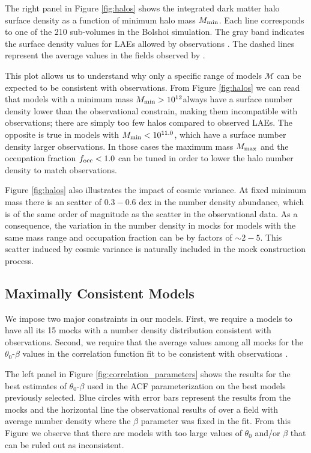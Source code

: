 \documentclass{emulateapj}
\newcommand{\hMsun}{{\ifmmode{h^{-1}{\rm
        {M_{\odot}}}}\else{$h^{-1}{\rm{M_{\odot}}}$}\fi}}
\begin{document}
The right panel in Figure \ref{fig:halos} shows the  integrated dark matter halo surface
density as a function of  minimum halo mass $M_{\rm min}$. Each line
corresponds to one of the 210 sub-volumes in the Bolshoi
simulation. The gray band indicates the surface density values for
LAEs allowed by observations \citep{Yamada2012}. The dashed lines
represent the average values in the fields observed by
\citep{Ouchi2008}. 
 
This plot allows us to understand why only a specific range of
models ${\mathcal M}$ can be expected to be consistent with
observations. From Figure \ref{fig:halos} we can read that models with
a minimum mass $M_{\rm min}>10^{12}$\hMsun always have a
surface number density lower than the observational constrain, making
them incompatible with observations; there are simply too few halos
compared to observed LAEs. The opposite is true in models with $M_{\rm
  min}<10^{11.0}$\hMsun, which have a surface number density larger
observations. In those cases the maximum mass $M_{\rm max}$ and the
occupation fraction $f_{\rm occ}<1.0$  can be tuned in order to lower
the halo number density to match observations.   

Figure \ref{fig:halos} also illustrates the impact of cosmic
variance. At fixed minimum mass there is an scatter of $0.3-0.6$ dex
in the number density abundance, which is of the same order of
magnitude as the scatter in the observational data.  As a consequence,
the variation in the number density in mocks for models with the same
mass range and occupation fraction can be by factors of $\sim 2-5$.
This scatter induced by cosmic variance is naturally included in the
mock construction process. 



\subsection{Maximally Consistent Models}



We impose two major constraints in our models. First, we require a 
models to have all its 15 mocks with a number density distribution
consistent with observations. Second, we require that the average
values among all mocks for the $\theta_{0}$-$\beta$ values in the
correlation function fit to be consistent with observations
\citep{Ouchi2008}. 

The left panel in Figure \ref{fig:correlation_parameters} shows the
results for the best estimates of $\theta_{0}$-$\beta$  used in the
ACF parameterization on the best models previously selected.  Blue
circles with error bars represent the results from the mocks and the
horizontal line the observational results of \cite{Ouchi2008} over a
field with average number density where the $\beta$ parameter was
fixed in the fit. From this Figure we observe that there are models
with too large values of $\theta_0$ and/or $\beta$ that can be ruled
out as inconsistent.
\end{document}
